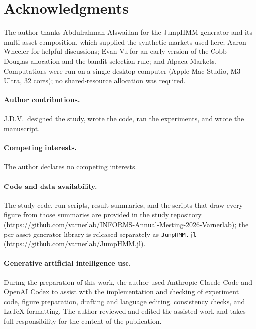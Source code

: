 \section*{Acknowledgments}
The author thanks Abdulrahman Alswaidan for the JumpHMM generator and its multi-asset composition, which supplied the
synthetic markets used here; Aaron Wheeler for helpful discussions; Evan Vu for an early version of the
Cobb--Douglas allocation and the bandit selection rule; and Alpaca Markets. Computations were run on a single desktop
computer (Apple Mac Studio, M3 Ultra, 32 cores); no shared-resource allocation was required.

\paragraph{Author contributions.}
J.D.V.\ designed the study, wrote the code, ran the experiments, and wrote the manuscript.

\paragraph{Competing interests.}
The author declares no competing interests.

\paragraph{Code and data availability.}
The study code, run scripts, result summaries, and the scripts that draw every figure from those summaries are
provided in the study repository (\url{https://github.com/varnerlab/INFORMS-Annual-Meeting-2026-Varnerlab}); the
per-asset generator library is released separately as \texttt{JumpHMM.jl}
(\url{https://github.com/varnerlab/JumpHMM.jl}).

\paragraph{Generative artificial intelligence use.}
During the preparation of this work, the author used Anthropic Claude Code and OpenAI Codex to assist with the
implementation and checking of experiment code, figure preparation, drafting and language editing, consistency
checks, and LaTeX formatting. The author reviewed and edited the assisted work and takes full responsibility for the
content of the publication.
